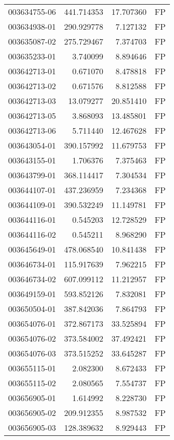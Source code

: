 \begin{tabular}{lrrl}
003634755-06 &  441.714353 &    17.707360 &   FP \\
003634938-01 &  290.929778 &     7.127132 &   FP \\
003635087-02 &  275.729467 &     7.374703 &   FP \\
003635233-01 &    3.740099 &     8.894646 &   FP \\
003642713-01 &    0.671070 &     8.478818 &   FP \\
003642713-02 &    0.671576 &     8.812588 &   FP \\
003642713-03 &   13.079277 &    20.851410 &   FP \\
003642713-05 &    3.868093 &    13.485801 &   FP \\
003642713-06 &    5.711440 &    12.467628 &   FP \\
003643054-01 &  390.157992 &    11.679753 &   FP \\
003643155-01 &    1.706376 &     7.375463 &   FP \\
003643799-01 &  368.114417 &     7.304534 &   FP \\
003644107-01 &  437.236959 &     7.234368 &   FP \\
003644109-01 &  390.532249 &    11.149781 &   FP \\
003644116-01 &    0.545203 &    12.728529 &   FP \\
003644116-02 &    0.545211 &     8.968290 &   FP \\
003645649-01 &  478.068540 &    10.841438 &   FP \\
003646734-01 &  115.917639 &     7.962215 &   FP \\
003646734-02 &  607.099112 &    11.212957 &   FP \\
003649159-01 &  593.852126 &     7.832081 &   FP \\
003650504-01 &  387.842036 &     7.864793 &   FP \\
003654076-01 &  372.867173 &    33.525894 &   FP \\
003654076-02 &  373.584002 &    37.492421 &   FP \\
003654076-03 &  373.515252 &    33.645287 &   FP \\
003655115-01 &    2.082300 &     8.672433 &   FP \\
003655115-02 &    2.080565 &     7.554737 &   FP \\
003656905-01 &    1.614992 &     8.228730 &   FP \\
003656905-02 &  209.912355 &     8.987532 &   FP \\
003656905-03 &  128.389632 &     8.929443 &   FP \\

\end{tabular}
